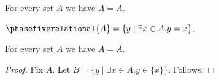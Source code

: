 \begin{axiom}\label{phase5_relational_support}
    For every set $A$ we have $A = A$.
\end{axiom}

\begin{definition}\label{phase5_relational_replacement_definition}
    $\phasefiverelational{A} = \{ y \mid \exists x\in A. y = x \}$.
\end{definition}

\begin{proposition}\label{phase5_relational_replacement_local}
    For every set $A$ we have $A = A$.
\end{proposition}
\begin{proof}
    Fix $A$.
    Let $B = \{ y \mid \exists x\in A. y\in\{x\} \}$.
    Follows.
\end{proof}
